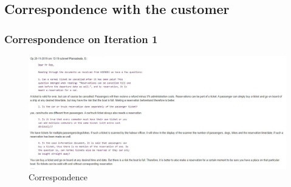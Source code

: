 







\subsection{Correspondence with the customer}
\begin{small}
% 
\end{small}

\subsubsection{Correspondence on Iteration 1}
\begin{small}
%
\begin{figure}[H]
    \centering
    \includegraphics[scale=0.4]{Iteration_2/Files/Iteration1Email.jpeg}
    \caption{Correspondence}
    \label{fig:my_label}
\end{figure}
\end{small}


